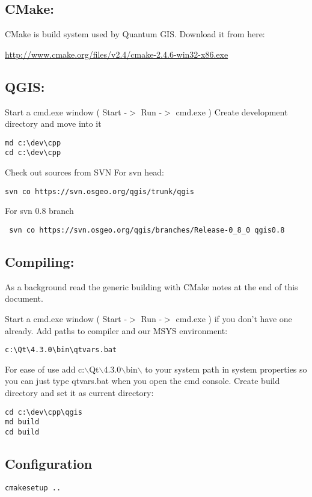 \subsection{CMake:}
CMake is build system used by Quantum GIS. Download it from here:

\url{http://www.cmake.org/files/v2.4/cmake-2.4.6-win32-x86.exe}

\subsection{QGIS:}
Start a cmd.exe window ( Start -$>$ Run -$>$ cmd.exe ) Create development 
directory and move into it

\begin{verbatim}
md c:\dev\cpp 
cd c:\dev\cpp 
\end{verbatim}

Check out sources from SVN For svn head:

\begin{verbatim}
svn co https://svn.osgeo.org/qgis/trunk/qgis 
\end{verbatim}
For svn 0.8 branch

\begin{verbatim}
 svn co https://svn.osgeo.org/qgis/branches/Release-0_8_0 qgis0.8
\end{verbatim}

\subsection{Compiling:}
As a background read the generic building with CMake notes at the end of 
this document.

Start a cmd.exe window ( Start -$>$ Run -$>$ cmd.exe ) if you don't have one
already.  Add paths to compiler and our MSYS environment:

\begin{verbatim}
c:\Qt\4.3.0\bin\qtvars.bat 
\end{verbatim}

For ease of use add c:$\backslash$Qt$\backslash$4.3.0$\backslash$bin$\backslash$ to your system path in system
properties so you can just type qtvars.bat when you open the cmd console.
Create build directory and set it as current directory:

\begin{verbatim}
cd c:\dev\cpp\qgis 
md build 
cd build 
\end{verbatim}

\subsection{Configuration}
\begin{verbatim}
cmakesetup ..  
\end{verbatim}

